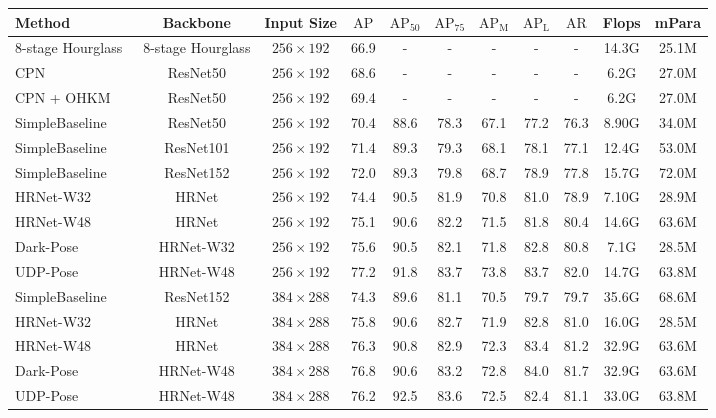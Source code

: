 \documentclass[10pt,twocolumn,letterpaper]{article}
\begin{document}
\begin{table*}[t]
\centering
\fontsize{7}{8}\selectfont
\begin{tabular}{l|c|c|c|ccccc|c|c}
\hline
Method       & Backbone   & Input Size    & $\mathrm{AP}$   & $\mathrm{AP_{50}}$ & $\mathrm{AP_{75}}$ & $\mathrm{AP_{M}}$  & $\mathrm{AP_{L}}$  & $\mathrm{AR}$ & Flops& mPara \\ \hline \hline
8-stage Hourglass~\cite{Newell16} & 8-stage Hourglass & $256\times192$ & 66.9 & - &- & - & 
- &  - & 14.3G & 25.1M\\
CPN \cite{Chen2018} & ResNet50 & $256\times192$ & 68.6 & - & - & - & - & - & 6.2G & 27.0M\\
CPN + OHKM  \cite{Chen2018} & ResNet50 & $256\times192$ & 69.4 & - & - & - & - & - & 6.2G & 27.0M\\
SimpleBaseline \cite{Xiao18} & ResNet50 & $256\times192$ & 70.4 & 88.6 &78.3 & 67.1 & 77.2 & 76.3 & 8.90G &34.0M\\
SimpleBaseline \cite{Xiao18} & ResNet101 & $256\times192$ & 71.4 & 89.3 & 79.3 & 68.1 & 78.1 & 77.1 &12.4G &53.0M\\
SimpleBaseline \cite{Xiao18} & ResNet152 & $256\times192$ & 72.0 & 89.3 &79.8 & 68.7 & 78.9 & 77.8 &15.7G &72.0M\\
HRNet-W32 \cite{Sun2019} & HRNet & $256\times192$ & 74.4 & 90.5 &81.9 & 70.8 & 81.0 & 78.9 &7.10G &28.9M\\
HRNet-W48 \cite{Sun2019} & HRNet & $256\times192$ & 75.1 & 90.6 &82.2 & 71.5 & 81.8 &  80.4 &14.6G&63.6M\\
Dark-Pose \cite{Zhang2020} & HRNet-W32 & $256\times192$ & 75.6 & 90.5 &82.1 & 71.8 & 82.8 & 80.8 &7.1G &28.5M\\
UDP-Pose \cite{Huang2020} & HRNet-W48 & $256\times192$ & 77.2 & 91.8 &83.7 & 73.8 & 83.7 & 82.0 &14.7G &63.8M\\
\hline
SimpleBaseline \cite{Xiao18} & ResNet152 & $384\times288$ & 74.3 & 89.6 & 81.1 & 70.5 & 79.7 & 79.7 &35.6G &68.6M\\
HRNet-W32 \cite{Sun2019} & HRNet & $384\times288$ & 75.8 & 90.6 & 82.7 & 71.9 & 82.8 & 81.0 &16.0G &28.5M\\
HRNet-W48 \cite{Sun2019} & HRNet & $384\times288$ & 76.3 & 90.8 & 82.9 & 72.3 & 83.4 & 81.2 &32.9G &63.6M\\
Dark-Pose \cite{Zhang2020} & HRNet-W48 & $384\times288$ & 76.8 &90.6 & 83.2 & 72.8 & 84.0 & 81.7 &32.9G &63.6M\\
UDP-Pose \cite{Huang2020} & HRNet-W48 & $384\times288$ &76.2& 92.5& 83.6& 72.5& 82.4& 81.1&33.0G &63.8M\\

\end{tabular}
\end{table*}
\end{document}
